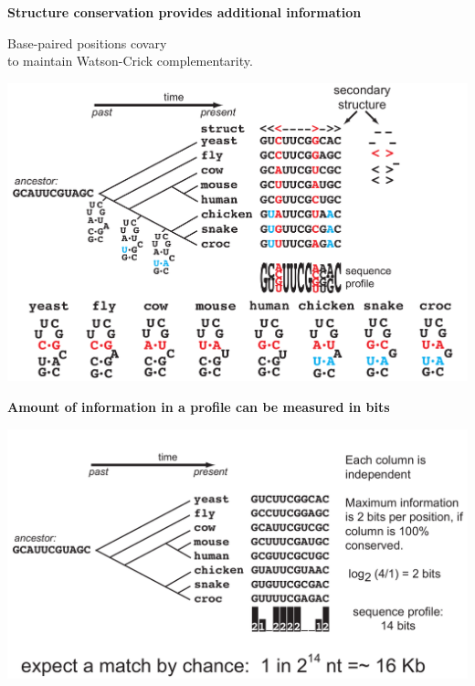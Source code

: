\documentclass[landscape]{slides}
\begin{document}
\begin{slide}
\begin{slide}
\vfill
\end{slide}
\begin{slide}
\begin{center}
\textbf{Structure conservation provides additional information}
\medskip

Base-paired positions covary \\ to maintain Watson-Crick complementarity.

\includegraphics[width=10in]{figs/seqstructprofiles-struct2}
\end{center}

\vfill
\end{slide}
\begin{slide}
\begin{center}
\textbf{Amount of information in a profile can be measured in bits}
\medskip

\includegraphics[width=9in]{figs/seqstructprofiles-2014-seqinfo}
\end{center}


\end{slide}
\end{slide}
\end{document}
